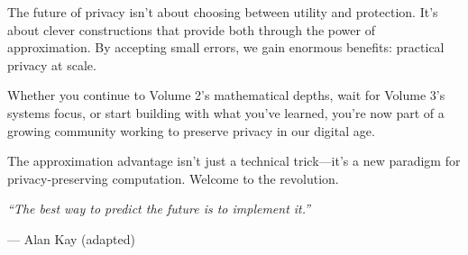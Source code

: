 The future of privacy isn't about choosing between utility and protection. It's about clever constructions that provide both through the power of approximation. By accepting small errors, we gain enormous benefits: practical privacy at scale.

Whether you continue to Volume 2's mathematical depths, wait for Volume 3's systems focus, or start building with what you've learned, you're now part of a growing community working to preserve privacy in our digital age.

The approximation advantage isn't just a technical trick—it's a new paradigm for privacy-preserving computation. Welcome to the revolution.

\vspace{2cm}
\begin{center}
\textit{``The best way to predict the future is to implement it.''}

\vspace{0.5cm}
— Alan Kay (adapted)
\end{center}